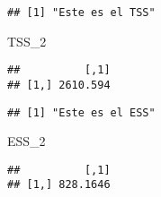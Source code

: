 \documentclass[
]{article}
\newenvironment{Shaded}{\begin{snugshade}}{\end{snugshade}}
\newcommand{\CommentTok}[1]{\textcolor[rgb]{0.56,0.35,0.01}{\textit{#1}}}
\newcommand{\DecValTok}[1]{\textcolor[rgb]{0.00,0.00,0.81}{#1}}
\newcommand{\KeywordTok}[1]{\textcolor[rgb]{0.13,0.29,0.53}{\textbf{#1}}}
\newcommand{\NormalTok}[1]{#1}
\newcommand{\OperatorTok}[1]{\textcolor[rgb]{0.81,0.36,0.00}{\textbf{#1}}}
\newcommand{\StringTok}[1]{\textcolor[rgb]{0.31,0.60,0.02}{#1}}
\begin{document}
\begin{Shaded}
\end{Shaded}

\begin{verbatim}
## [1] "Este es el TSS"
\end{verbatim}

\begin{Shaded}
\begin{Highlighting}[]
\NormalTok{TSS_}\DecValTok{2}
\end{Highlighting}
\end{Shaded}

\begin{verbatim}
##          [,1]
## [1,] 2610.594
\end{verbatim}

\begin{Shaded}
\end{Shaded}

\begin{verbatim}
## [1] "Este es el ESS"
\end{verbatim}

\begin{Shaded}
\begin{Highlighting}[]
\NormalTok{ESS_}\DecValTok{2}
\end{Highlighting}
\end{Shaded}

\begin{verbatim}
##          [,1]
## [1,] 828.1646
\end{verbatim}
\end{document}
